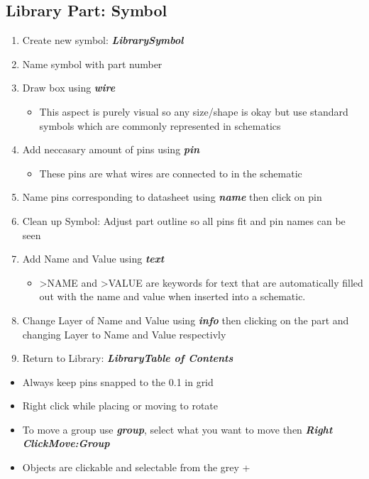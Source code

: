 \documentclass{article}
\begin{document}
\subsection{Library Part: Symbol}
\begin{enumerate}
    \item Create new symbol: \textit{\textbf{Library\textrightarrow Symbol}}
    \item Name symbol with part number
    \item Draw box using \textit{\textbf{wire}}
    \begin{itemize}
        \item This aspect is purely visual so any size/shape is okay but use
        standard symbols which are commonly represented in schematics
    \end{itemize}
    \item Add neccasary amount of pins using \textit{\textbf{pin}}
    \begin{itemize}
        \item These pins are what wires are connected to in the schematic
    \end{itemize}
    \item Name pins corresponding to datasheet using \textit{\textbf{name}} then
    click on pin
    \item Clean up Symbol: Adjust part outline so all pins fit and pin names can
    be seen
    \item Add Name and Value using \textit{\textbf{text}}
    \begin{itemize}
        \item \textgreater NAME and  \textgreater VALUE are keywords for text
        that are automatically filled out with the name and value when inserted
        into a schematic.
    \end{itemize}
    \item Change Layer of Name and Value using \textit{\textbf{info}} then
    clicking on the part and changing Layer to Name and Value respectivly
    \item Return to Library: \textit{\textbf{Library\textrightarrow Table
    of Contents}}
\end{enumerate}
\begin{tcolorbox} [title=Tips \& Tricks]
    \begin{itemize}
        \item Always keep pins snapped to the 0.1 in grid
        \item Right click while placing or moving to rotate
        \item To move a group use \textit{\textbf{group}}, select what you want
        to move then \textit{\textbf{Right Click\textrightarrow Move:Group}}
        \item Objects are clickable and selectable from the grey +
    \end{itemize}
\end{tcolorbox}
\end{document}
